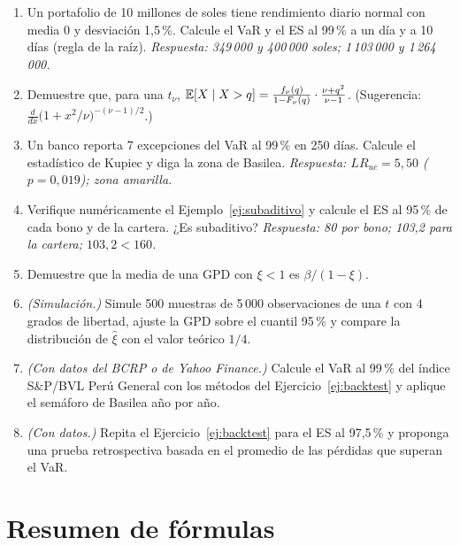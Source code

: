 \begin{enumerate}[label=\textbf{\thechapter.\arabic*},leftmargin=*,itemsep=6pt]
  \item Un portafolio de 10 millones de soles tiene rendimiento diario normal con media 0 y desviación 1,5\,\%. Calcule el VaR
  y el ES al 99\,\% a un día y a 10 días (regla de la raíz). \textit{Respuesta: 349\,000 y 400\,000 soles; 1\,103\,000 y 1\,264\,000.}

  \item Demuestre que, para una $t_\nu$, $\mathbb{E}[X\mid X>q]=\frac{f_\nu(q)}{1-F_\nu(q)}\cdot\frac{\nu+q^2}{\nu-1}$. (Sugerencia:
  $\frac{d}{dx}\bigl(1+x^2/\nu\bigr)^{-(\nu-1)/2}$.)

  \item Un banco reporta 7 excepciones del VaR al 99\,\% en 250 días. Calcule el estadístico de Kupiec y diga la zona de
  Basilea. \textit{Respuesta: $LR_{uc}=5{,}50$ ($p=0{,}019$); zona amarilla.}

  \item Verifique numéricamente el Ejemplo~\ref{ej:subaditivo} y calcule el ES al 95\,\% de cada bono y de la cartera.
  ¿Es subaditivo? \textit{Respuesta: 80 por bono; 103,2 para la cartera; $103{,}2<160$.}

  \item Demuestre que la media de una GPD con $\xi<1$ es $\beta/(1-\xi)$.

  \item \emph{(Simulación.)} Simule 500 muestras de 5\,000 observaciones de una $t$ con 4 grados de libertad, ajuste la GPD
  sobre el cuantil 95\,\% y compare la distribución de $\hat\xi$ con el valor teórico $1/4$.

  \item \emph{(Con datos del BCRP o de Yahoo Finance.)} Calcule el VaR al 99\,\% del índice S\&P/BVL Perú General con los
  métodos del Ejercicio~\ref{ej:backtest} y aplique el semáforo de Basilea año por año.

  \item \emph{(Con datos.)} Repita el Ejercicio~\ref{ej:backtest} para el ES al 97,5\,\% y proponga una prueba
  retrospectiva basada en el promedio de las pérdidas que superan el VaR.
\end{enumerate}

\section{Resumen de fórmulas}

